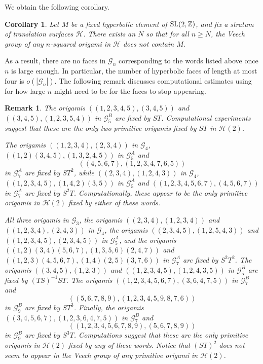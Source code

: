 \documentclass[a4paper,11pt]{amsart}
\numberwithin{equation}{section}
\numberwithin{figure}{section}
\numberwithin{table}{section}
\newtheorem{corollary}[theorem]{Corollary}
\newtheorem{remark}[theorem]{Remark}
\newcommand{\calH}{\mathcal{H}}
\newcommand{\Z}{\mathbb{Z}}
\DeclareMathOperator{\SL}{{\rm{SL}}}
\begin{document}
We obtain the following corollary.

\begin{corollary}\label{cor:hyperbolic}
    Let $M$ be a fixed hyperbolic element of $\SL(2,\Z)$, and fix a stratum of translation surfaces $\calH$. There exists an $N$ so that for all $n\geq N$, the Veech group of any $n$-squared origami in $\calH$ does not contain $M$.
\end{corollary}

As a result, there are no faces in $\mathcal{G}_{n}$ corresponding to the words listed above once $n$ is large enough. In particular, the number of hyperbolic faces of length at most four is $o(|\mathcal{G}_{n}|)$. The following remark discusses computational estimates using~\cite{flatsurf,surf-dyn,Sage} for how large $n$ might need to be for the faces to stop appearing.

\begin{remark}
    The origamis $((1,2,3,4,5),(3,4,5))$ and $((3,4,5),(1,2,3,5,4))$ in $\mathcal{G}_{5}^{B}$ are fixed by $ST$. Computational experiments suggest that these are the only two primitive origamis fixed by $ST$ in $\calH(2)$.

    The origamis $((1,2,3,4),(2,3,4))$ in $\mathcal{G}_{4}$, $((1,2)(3,4,5),(1,3,2,4,5))$ in $\mathcal{G}_{5}^{A}$ and $$((4,5,6,7),(1,2,3,4,7,6,5))$$ in $\mathcal{G}_{7}^{A}$ are fixed by $ST^{2}$, while $((2,3,4),(1,2,4,3))$ in $\mathcal{G}_{4}$, $((1,2,3,4,5),(1,4,2)(3,5))$ in $\mathcal{G}_{5}^{A}$ and $((1,2,3,4,5,6,7),(4,5,6,7))$ in $\mathcal{G}_{7}^{A}$ are fixed by $S^2T$. Computationally, these appear to be the only primitive origamis in $\calH(2)$ fixed by either of these words.

    All three origamis in $\mathcal{G}_{3}$, the origamis $((2,3,4),(1,2,3,4))$ and $((1,2,3,4),(2,4,3))$ in $\mathcal{G}_{4}$, the origamis $((2,3,4,5),(1,2,5,4,3))$ and $((1,2,3,4,5),(2,3,4,5))$ in $\mathcal{G}_{5}^{A}$, and the origamis $((1,2)(3,4)(5,6,7),(1,3,5,6)(2,4,7))$ and $((1,2,3)(4,5,6,7),(1,4)(2,5)(3,7,6))$ in $\mathcal{G}_{7}^{A}$ are fixed by $S^{2}T^{2}$. The origamis $((3,4,5),(1,2,3))$ and $((1,2,3,4,5),(1,2,4,3,5))$ in $\mathcal{G}_{5}^{B}$ are fixed by $(TS)^{-1}ST$. The origamis $((1,2,3,4,5,6,7),(3,6,4,7,5))$ in $\mathcal{G}_{7}^{B}$ and $$((5,6,7,8,9),(1,2,3,4,5,9,8,7,6))$$ in $\mathcal{G}_{9}^{B}$ are fixed by $ST^{3}$. Finally, the origamis $((3,4,5,6,7),(1,2,3,6,4,7,5))$ in $\mathcal{G}_{7}^{B}$ and $$((1,2,3,4,5,6,7,8,9),(5,6,7,8,9))$$ in $\mathcal{G}_{9}^{B}$ are fixed by $S^{3}T$. Computations suggest that these are the only primitive origamis in $\calH(2)$ fixed by any of these words. Notice that $(ST)^2$ does not seem to appear in the Veech group of any primitive origami in $\calH(2)$.
\end{remark}
\end{document}

